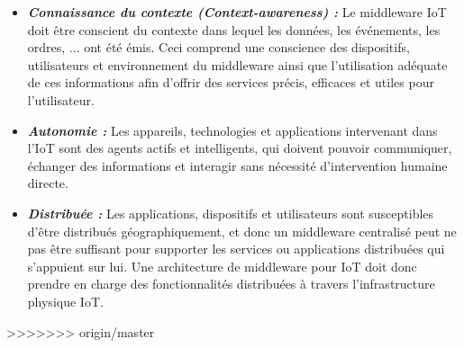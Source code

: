 \begin{itemize}
\item \textbf{\textit{Connaissance du contexte (Context-awareness) :}} Le middleware IoT doit être conscient du contexte dans lequel les données, les événements, les ordres, ... ont été émis. Ceci comprend une conscience des dispositifs, utilisateurs et environnement du middleware ainsi que l'utilisation adéquate de ces informations afin d'offrir des services précis, efficaces et utiles pour l'utilisateur.\\
\item \textbf{\textit{Autonomie :}} Les appareils, technologies et applications intervenant dans l'IoT sont des agents actifs et intelligents, qui doivent pouvoir communiquer, échanger des informations  et interagir sans nécessité d'intervention humaine directe.\\
\item \textbf{\textit{Distribuée :}} Les applications, dispositifs et utilisateurs sont susceptibles d'être distribués géographiquement, et donc un middleware centralisé peut ne pas être suffisant pour supporter les services ou applications distribuées qui s'appuient sur lui. Une architecture de middleware pour IoT doit donc prendre en charge des fonctionnalités distribuées à travers l'infrastructure physique IoT.\\
\end{itemize}
>>>>>>> origin/master
